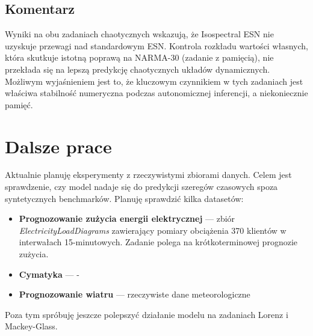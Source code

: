 \documentclass[12pt, a4paper]{article}
\begin{document}
\subsection{Komentarz}

Wyniki na obu zadaniach chaotycznych wskazują, że Isospectral ESN nie uzyskuje przewagi nad standardowym ESN. Kontrola rozkładu wartości własnych, która skutkuje istotną poprawą na NARMA-30 (zadanie z pamięcią), nie przekłada się na lepszą predykcję chaotycznych układów dynamicznych. Możliwym wyjaśnieniem jest to, że kluczowym czynnikiem w tych zadaniach jest właściwa stabilność numeryczna podczas autonomicznej inferencji, a niekoniecznie pamięć. 

\section{Dalsze prace}

Aktualnie planuję  eksperymenty z rzeczywistymi zbiorami danych. Celem jest sprawdzenie, czy model nadaje się do predykcji szeregów czasowych spoza syntetycznych benchmarków. Planuję sprawdzić kilka datasetów:

\begin{itemize}
    \item \textbf{Prognozowanie zużycia energii elektrycznej} --- zbiór \textit{ElectricityLoadDiagrams} zawierający pomiary obciążenia 370 klientów w interwałach 15-minutowych. Zadanie polega na krótkoterminowej prognozie zużycia.
    \item \textbf{Cymatyka} --- -
    \item \textbf{Prognozowanie wiatru} --- rzeczywiste dane meteorologiczne
\end{itemize}

Poza tym spróbuję jeszcze polepszyć działanie modelu na zadaniach Lorenz i Mackey-Glass.
\end{document}
